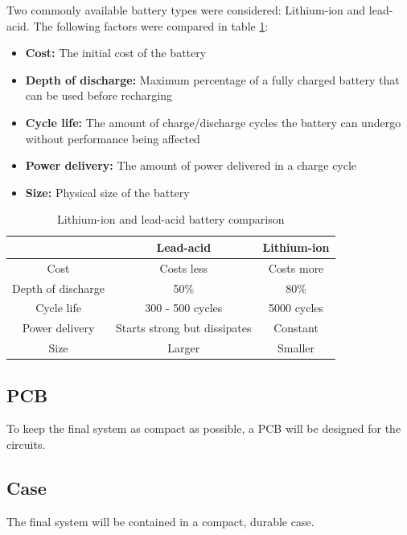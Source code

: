 Two commonly available battery types were considered: Lithium-ion and lead-acid. The following factors were compared in table \ref{tab:battery_comp}: 

\begin{itemize}
    \item \textbf{Cost:} The initial cost of the battery
    \item \textbf{Depth of discharge:} Maximum percentage of a fully charged battery that can be used before recharging
    \item \textbf{Cycle life:} The amount of charge/discharge cycles the battery can undergo without performance being affected
    \item \textbf{Power delivery:} The amount of power delivered in a charge cycle
    \item \textbf{Size:} Physical size of the battery
\end{itemize}

\begin{table}[!h]
    \centering
    \begin{tabular}{|c||c|c|}
        \hline
         &  Lead-acid & Lithium-ion \\
        \hline
        Cost & Costs less & Costs more \\
        Depth of discharge \cite{battery_10_diff} & 50\% & 80\% \\
        Cycle life \cite{battery_10_diff} & 300 - 500 cycles & 5000 cycles \\
        Power delivery \cite{battery_guide} & Starts strong but dissipates & Constant \\
        Size \cite{battery_10_diff} & Larger & Smaller \\
        \hline
    \end{tabular}
    \caption{Lithium-ion and lead-acid battery comparison}
    \label{tab:battery_comp}
\end{table}

\subsection{PCB}
To keep the final system as compact as possible, a PCB will be designed for the circuits.

\subsection{Case}
The final system will be contained in a compact, durable case.
